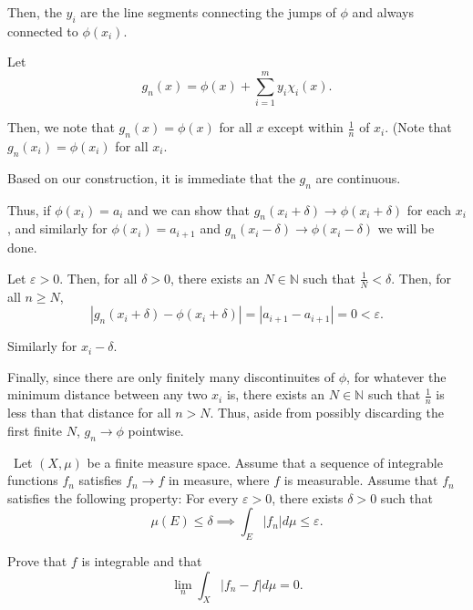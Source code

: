 \documentclass[12pt]{Homework}
\begin{document}
\begin{solution}
Then, the $y_i$ are the line segments connecting the jumps of $\phi$ and always connected to $\phi(x_i)$.

Let $$g_n(x)=\phi(x)+\sum_{i=1}^my_i\chi_i(x).$$

Then, we note that $g_n(x)=\phi(x)$ for all $x$ except within $\frac{1}{n}$ of $x_i$. (Note that $g_n(x_i)=\phi(x_i)$ for all $x_i$.

Based on our construction, it is immediate that the $g_n$ are continuous.

Thus, if $\phi(x_i)=a_i$ and we can show that $g_n(x_i+\delta)\to \phi(x_i+\delta)$ for each $x_i$, and similarly for $\phi(x_i)=a_{i+1}$ and $g_n(x_i-\delta)\to\phi(x_i-\delta)$ we will be done.

Let $\varepsilon>0$. Then, for all $\delta>0$, there exists an $N\in\mathbb{N}$ such that $\frac{1}{N}<\delta$. Then, for all $n\ge N$, $$|g_n(x_i+\delta)-\phi(x_i+\delta)|=|a_{i+1}-a_{i+1}|=0<\varepsilon.$$

Similarly for $x_i-\delta$.

Finally, since there are only finitely many discontinuites of $\phi$, for whatever the minimum distance between any two $x_i$ is, there exists an $N\in\mathbb{N}$ such that $\frac{1}{n}$ is less than that distance for all $n>N$. Thus, aside from possibly discarding the first finite $N$, $g_n\to \phi$ pointwise.
\end{solution}
\newpage

\begin{problem} $\,$
Let $(X,\mu)$ be a finite measure space. Assume that a sequence of integrable functions $f_n$ satisfies $f_n\to f$ in measure, where $f$ is measurable. Assume that $f_n$ satisfies the following property: For every $\varepsilon>0$, there exists $\delta>0$ such that $$\mu(E)\le \delta\implies\int_E|f_n|d\mu\le\varepsilon.$$

Prove that $f$ is integrable and that $$\lim_n\int_X|f_n-f|d\mu=0.$$
\end{problem}
\end{document}
